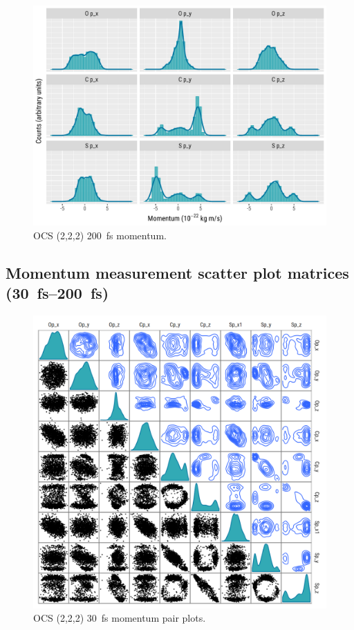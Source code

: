 \begin{figure}
  \centering
  \includegraphics[width=\textwidth]{Plots/OCS222200fsMomentum}
  \caption[OCS (2,2,2) \SI{200}{\fs} momentum.]
  {OCS (2,2,2) \SI{200}{\fs} momentum.}
  \label{fig:OCS222200fsMomentum}
\end{figure}

\subsection{Momentum measurement scatter plot matrices (\SIrange{30}{200}{\femto\s})}

\begin{figure}[H]
  \centering
  \includegraphics[width=\textwidth]{Plots/OCS22230fsMomentumPairPlots.png}
  \caption[OCS (2,2,2) \SI{30}{\fs} momentum pair plots.]
  {OCS (2,2,2) \SI{30}{\fs} momentum pair plots.}
  \label{fig:OCS22230fsMomentumPairPlots}
\end{figure}


